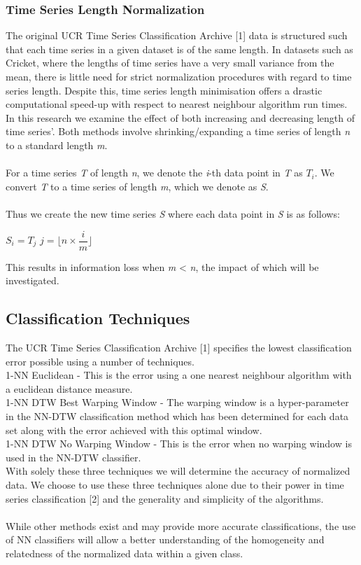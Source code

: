 \documentclass[10pt,a4paper]{article}
\newcommand\tab[1][1cm]{\hspace*{#1}}
\begin{document}
\subsubsection{Time Series Length Normalization}

The original UCR Time Series Classification Archive [1] data is structured such that each time series in a given dataset is of the same length.
In datasets such as Cricket, where the lengths of time series have a very small variance from the mean, there is little need for strict normalization procedures with regard to time series length.
Despite this, time series length minimisation offers a drastic computational speed-up with respect to nearest neighbour algorithm run times.
In this research we examine the effect of both increasing and decreasing length of time series'. 
Both methods involve shrinking/expanding a time series of length \textit{n} to a standard length \textit{m}. 
\\\\
For a time series \textit{T} of length \textit{n}, we denote the \textit{i}-th data point in \textit{T} as $\textit{T}_{i}$.
We convert \textit{T} to a time series of length \textit{m}, which we denote as \textit{S}.
\\\\
Thus we create the new time series \textit{S} where each data point in \textit{S} is as follows:
\begin{center}
$\textit{S}_{i} = \textit{T}_{j}$ \tab $j = \lfloor n \times \dfrac{i}{m} \rfloor$
\end{center}
This results in information loss when \textit{m} < \textit{n}, the impact of which will be investigated.


\subsection{Classification Techniques}

The UCR Time Series Classification Archive [1] specifies the lowest classification error possible using a number of techniques.\\
1-NN Euclidean - This is the error using a one nearest neighbour algorithm with a euclidean distance measure.\\
1-NN DTW Best Warping Window - The warping window is a hyper-parameter in the NN-DTW classification method which has been determined for each data set along with the error achieved with this optimal window.\\
1-NN DTW No Warping Window - This is the error when no warping window is used in the NN-DTW classifier.\\
With solely these three techniques we will determine the accuracy of normalized data.
We choose to use these three techniques alone due to their power in time series classification [2] and the generality and simplicity of the algorithms.
\\\\
While other methods exist and may provide more accurate classifications, the use of NN classifiers will allow a better understanding of the homogeneity and relatedness of the normalized data within a given class.
\end{document}
